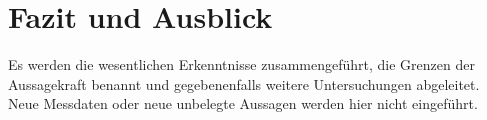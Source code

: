 \chapter{Fazit und Ausblick}
\label{chap:conclusion}

Es werden die wesentlichen Erkenntnisse zusammengeführt, die Grenzen der
Aussagekraft benannt und gegebenenfalls weitere Untersuchungen abgeleitet.
Neue Messdaten oder neue unbelegte Aussagen werden hier nicht eingeführt.
